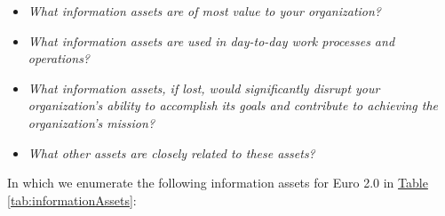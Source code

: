 \documentclass[12pt]{article} %
\newcommand{\hypertableref}[1]{\hyperref[#1]{Table \ref{#1}}}
\begin{document}
{\begin{itemize}
	\item \textit{What information assets are of most value to your organization?}
	\item \textit{What information assets are used in day-to-day work processes and operations?}
	\item \textit{What information assets, if lost, would significantly disrupt your organization’s ability to accomplish its goals and contribute to achieving the organization’s mission?}
	\item \textit{What other assets are closely related to these assets?}
\end{itemize}

In which we enumerate the following information assets for Euro 2.0 in \hypertableref{tab:informationAssets}:

}
\end{document}
